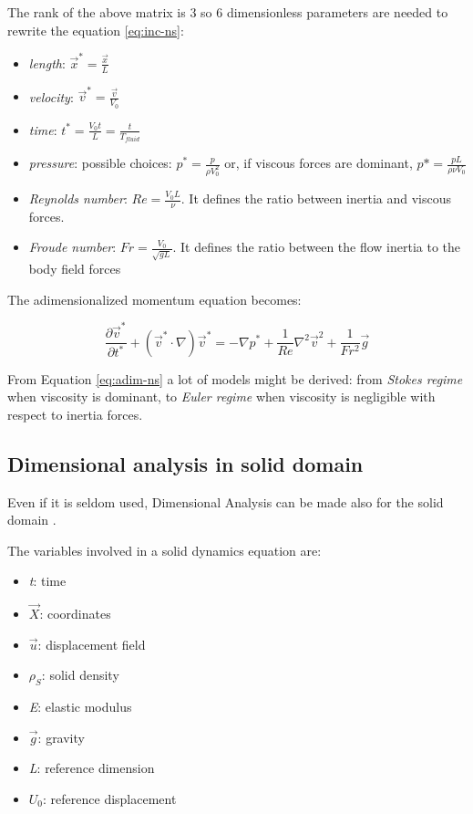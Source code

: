 The rank of the above matrix is 3 so 6 dimensionless parameters are needed to rewrite the equation \ref{eq:inc-ns}:

\begin{itemize}
	\item \textit{length}: $\vec{x}^* = \frac{\vec{x}}{L}$
	\item \textit{velocity}: $\vec{v}^* = \frac{\vec{v}}{V_0}$
	\item \textit{time}: $t^* = \frac{V_0 t}{L} = \frac{t}{T_{fluid}}$
	\item \textit{pressure}: possible choices: $p^* = \frac{p}{\rho V_0^2}$ or, if viscous forces are dominant, $p*= \frac{p L}{\rho \nu V_0}$
	\item \textit{Reynolds number}: $Re=\frac{V_0 L}{\nu}$. It defines the ratio between inertia and viscous forces.
	\item \textit{Froude number}: $Fr = \frac{V_0}{\sqrt{g L}}$. It defines the ratio between the flow inertia to the body field forces
\end{itemize} 


The adimensionalized momentum equation becomes:

\begin{equation}
	\frac{\partial \vec{v}^*}{\partial t^*} + \left( \vec{v}^* \cdot \nabla \right) \vec{v}^* = -\nabla p^* +\frac{1}{Re} \nabla^2 \vec{v}^2 + \frac{1}{Fr^2}\vec{g}
	\label{eq:adim-ns}
\end{equation}

From Equation \ref{eq:adim-ns} a lot of models might be derived: from \textit{Stokes regime} when viscosity is dominant, to \textit{Euler regime} when viscosity is negligible with respect to inertia forces.


\subsection{Dimensional analysis in solid domain}

Even if it is seldom used, Dimensional Analysis can be made also for the solid domain \cite{longo2011analisi}.

The variables involved in a solid dynamics equation are:

\begin{itemize}
	\item \textit{t}: time
	\item $\vec{X}$: coordinates
	\item $\vec{u}$: displacement field
	\item $\rho_S$: solid density
	\item \textit{E}: elastic modulus
	\item $\vec{g}$: gravity
	\item \textit{L}: reference dimension
	\item $U_0$: reference displacement
\end{itemize}


